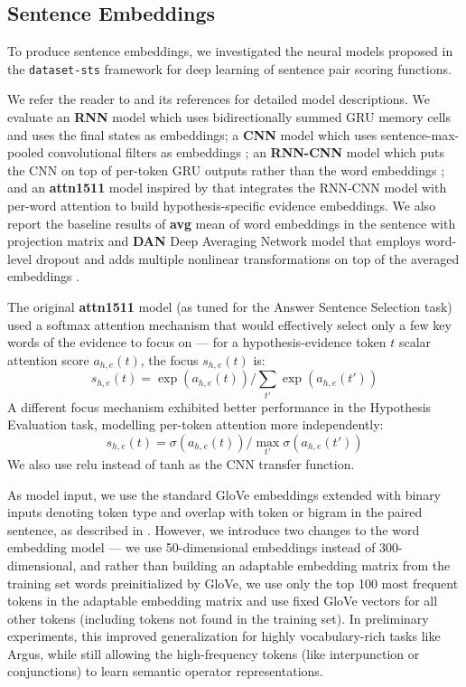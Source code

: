 \documentclass[11pt]{article}
\begin{document}
\subsection{Sentence Embeddings}

To produce sentence embeddings, we investigated the
neural models proposed in the \texttt{da\-ta\-set-sts} framework
for deep learning of sentence pair scoring functions. \cite{sps}

We refer the reader to \cite{sps} and its references for detailed
model descriptions.  We evaluate an \textbf{RNN} model which uses bidirectionally
summed GRU memory cells \cite{GRU} and uses the final states as embeddings;
a \textbf{CNN} model which uses sentence-max-pooled convolutional filters as embeddings \cite{KimMultichannelCNN};
an \textbf{RNN-CNN} model which puts the CNN on top of per-token GRU outputs
rather than the word embeddings \cite{attn1511}; and an \textbf{attn1511} model
inspired by \cite{attn1511} that integrates the RNN-CNN model
with per-word attention to build hypothesis-specific evidence embeddings.
We also report the baseline results of
\textbf{avg} mean of word embeddings in the sentence with projection matrix
and \textbf{DAN} Deep Averaging Network model that employs word-level dropout
and adds multiple nonlinear transformations on top of the averaged embeddings \cite{DAN}.

The original \textbf{attn1511} model \cite{sps} (as tuned for the Answer Sentence Selection task)
used a softmax attention mechanism that would effectively select only a few key words
of the evidence to focus on --- for a hypothesis-evidence token $t$ scalar attention score $a_{h,e}(t)$,
the focus $s_{h,e}(t)$ is:
$$ s_{h,e}(t) = \exp(a_{h,e}(t)) / \sum_{t'} \exp(a_{h,e}(t')) $$
A different focus mechanism exhibited better performance in the Hypothesis Evaluation task,
modelling per-token attention more independently:
$$ s_{h,e}(t) = \sigma(a_{h,e}(t)) / \max_{t'} \sigma(a_{h,e}(t')) $$
We also use relu instead of tanh as the CNN transfer function.

As model input, we use the standard GloVe embeddings \cite{GloVe}
extended with binary inputs denoting token type and overlap with token or bigram in the paired sentence,
as described in \cite{sps}.
However, we introduce two changes to the word
embedding model --- we use 50-dimensional embeddings instead of 300-dimensional,
and rather than building an adaptable embedding matrix from the
training set words preinitialized by GloVe, we use only the top 100
most frequent tokens in the adaptable embedding matrix and use
fixed GloVe vectors for all other tokens (including tokens not
found in the training set).  In preliminary experiments, this improved generalization
for highly vocabulary-rich tasks like Argus, while still allowing the high-frequency
tokens (like interpunction or conjunctions) to learn semantic operator representations.
\end{document}
